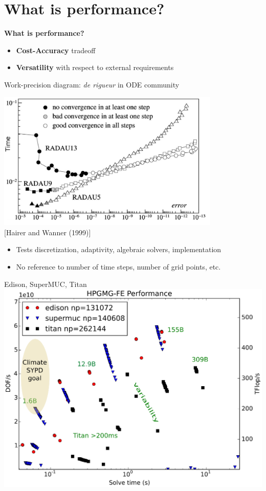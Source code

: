 \documentclass{beamer}
\begin{document}
\section{What is performance?}
\begin{frame}
  \bigskip
  \begin{center}
    {\LARGE \bf What is performance?}
  \end{center}
  \bigskip
  \begin{itemize}
  \item<2> {\Large {\bf Cost-Accuracy} tradeoff}
  \item<2> {\Large {\bf Versatility} with respect to external requirements}
  \end{itemize}
\end{frame}

\begin{frame}{Work-precision diagram: \emph{de rigueur} in ODE community}
  \begin{center}
    \includegraphics[width=0.8\textwidth]{figures/HairerWanner-WorkPrecision.png}\\
    {\scriptsize [Hairer and Wanner (1999)]}
  \end{center}
  \begin{itemize}
  \item Tests discretization, adaptivity, algebraic solvers, implementation
  \item No reference to number of time steps, number of grid points, etc.
  \end{itemize}
\end{frame}

\begin{frame}{Edison, SuperMUC, Titan}
  \includegraphics[width=\textwidth]{figures/hpgmg/range-edison-supermuc-titan-ann2.eps}
\end{frame}
\end{document}
